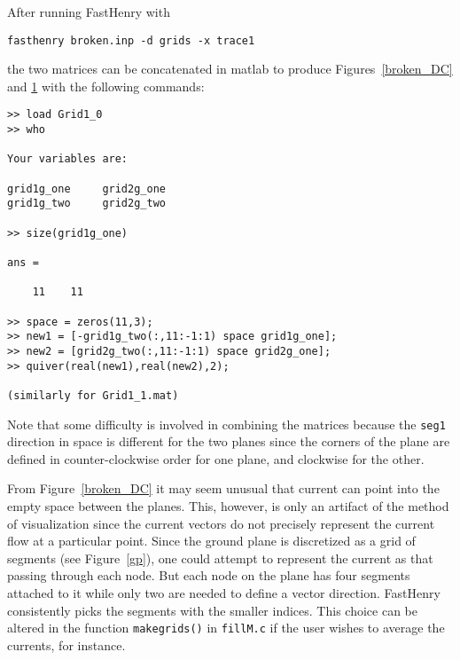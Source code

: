 \begin{figure}
\centerline{
}
\caption{}
\label{broken_highf}
\end{figure}

After running FastHenry with
\begin{verbatim}
fasthenry broken.inp -d grids -x trace1
\end{verbatim}
the two matrices can be concatenated in matlab to produce
Figures~\ref{broken_DC} and \ref{broken_highf} with the following
commands:
\begin{verbatim}
>> load Grid1_0
>> who

Your variables are:

grid1g_one     grid2g_one
grid1g_two     grid2g_two

>> size(grid1g_one)

ans =

    11    11

>> space = zeros(11,3);
>> new1 = [-grid1g_two(:,11:-1:1) space grid1g_one];
>> new2 = [grid2g_two(:,11:-1:1) space grid2g_one];
>> quiver(real(new1),real(new2),2);

(similarly for Grid1_1.mat)
\end{verbatim}

Note that some difficulty is involved in combining the matrices
because the {\tt seg1} direction in space is different for the two
planes since the corners of the plane are defined in counter-clockwise
order for one plane, and clockwise for the other.

From Figure~\ref{broken_DC} it may seem unusual that current can point
into the empty space between the planes.  This, however, is only an
artifact of the method of visualization
since the current vectors do not precisely represent the
current flow at a particular point.  Since the ground plane is
discretized as a grid of segments (see Figure~\ref{gp}), one could
attempt to represent the current as that passing through each node.
But each node on the plane has four segments attached to it while only
two are needed to define a vector direction.  FastHenry consistently
picks the segments with the smaller indices.  This choice can be altered in
the function {\tt makegrids()} in {\tt fillM.c} if the user
wishes to average the currents, for instance.

\begin{figure}
\centerline{
}
\caption{}
\label{holey_gp_highf}
\end{figure}

